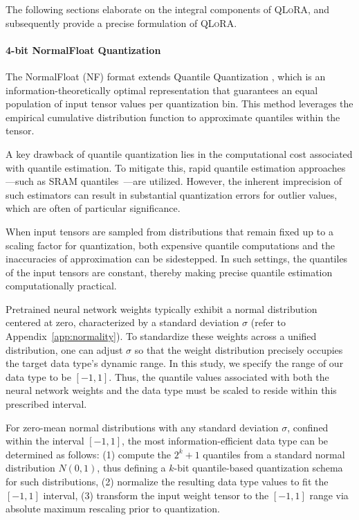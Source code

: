 The following sections elaborate on the integral components of \textsc{QLoRA}, and subsequently provide a precise formulation of \textsc{QLoRA}.

\paragraph{4-bit NormalFloat Quantization} The NormalFloat (NF) format extends Quantile Quantization \citep{dettmers2022optimizers}, which is an information-theoretically optimal representation that guarantees an equal population of input tensor values per quantization bin. This method leverages the empirical cumulative distribution function to approximate quantiles within the tensor.

A key drawback of quantile quantization lies in the computational cost associated with quantile estimation. To mitigate this, rapid quantile estimation approaches—such as SRAM quantiles~\citep{dettmers2022optimizers}—are utilized. However, the inherent imprecision of such estimators can result in substantial quantization errors for outlier values, which are often of particular significance.

When input tensors are sampled from distributions that remain fixed up to a scaling factor for quantization, both expensive quantile computations and the inaccuracies of approximation can be sidestepped. In such settings, the quantiles of the input tensors are constant, thereby making precise quantile estimation computationally practical.

Pretrained neural network weights typically exhibit a normal distribution centered at zero, characterized by a standard deviation $\sigma$ (refer to Appendix~\ref{app:normality}). To standardize these weights across a unified distribution, one can adjust $\sigma$ so that the weight distribution precisely occupies the target data type’s dynamic range. In this study, we specify the range of our data type to be $[-1, 1]$. Thus, the quantile values associated with both the neural network weights and the data type must be scaled to reside within this prescribed interval.

For zero-mean normal distributions with any standard deviation $\sigma$, confined within the interval $[-1, 1]$, the most information-efficient data type can be determined as follows: (1) compute the $2^k+1$ quantiles from a standard normal distribution $N(0,1)$, thus defining a $k$-bit quantile-based quantization schema for such distributions, (2) normalize the resulting data type values to fit the $[-1, 1]$ interval, (3) transform the input weight tensor to the $[-1, 1]$ range via absolute maximum rescaling prior to quantization.

